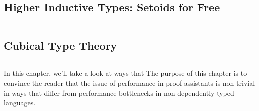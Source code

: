 \subsection{Higher Inductive Types: Setoids for Free}\label{sec:fixes:theory:HITs}\label{sec:HITs}
$\left.\right.$
\subsection{Cubical Type Theory}\label{sec:fixes:theory:cubical}\label{sec:cubical}
$\left.\right.$


In this chapter, we'll take a look at ways that
The purpose of this chapter is to convince the reader that the issue of performance in proof assistants is non-trivial in ways that differ from performance bottlenecks in non-dependently-typed languages.



